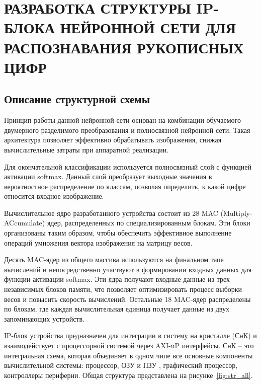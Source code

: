 \chapter[Разработка структуры IP-блока нейронной сети для распознавания рукописных цифр]
{РАЗРАБОТКА СТРУКТУРЫ IP-БЛОКА НЕЙРОННОЙ СЕТИ ДЛЯ РАСПОЗНАВАНИЯ РУКОПИСНЫХ ЦИФР}

\section{Описание структурной схемы}\par
\hspace*{12.5 mm}Принцип работы данной нейронной сети основан на комбинации 
обучаемого двумерного разделимого преобразования и полносвязной нейронной сети. 
Такая архитектура позволяет эффективно обрабатывать изображения, снижая 
вычислительные затраты при аппаратной реализации.

Для окончательной классификации используется полносвязный слой с функцией 
активации {softmax}. Данный слой преобразует выходные значения в вероятностное 
распределение по классам, позволяя определить, к какой цифре относится входное 
изображение.

Вычислительное ядро разработанного устройства состоит из 28 MAC 
(Multiply-ACcumulate) ядер, распределенных по специализированным блокам. Эти 
блоки организованы таким образом, чтобы обеспечить эффективное выполнение 
операций умножения вектора изображения на матрицу весов.

Десять MAC-ядер из общего массива используются на финальном тапе вычислений и 
непосредственно участвуют в формировании входных данных для функции активации 
softmax. Эти ядра получают входные данные из трех независимых блоков памяти, 
что позволяет оптимизировать процесс выборки весов и повысить скорость 
вычислений. Остальные 18 MAC-ядер распределены по блокам, где каждая 
вычислительная единица получает данные из двух запоминающих устройств.

IP-блок устройства предназначен для интеграции в систему на кристалле (СнК) и 
взаимодействует с процессорной системой через AXI-uP интерфейсы. СнК – это 
интегральная схема, которая объединяет в одном чипе все основные компоненты
вычислительной системы: процессор, ОЗУ и ПЗУ , графический процессор, 
контроллеры периферии. Общая структура представлена на 
рисунке~\ref{fig:str_all}.

